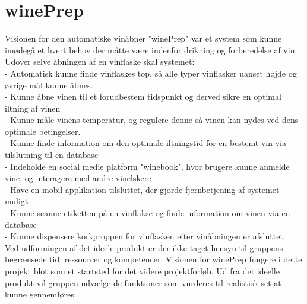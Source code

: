 \section{winePrep}
Visionen for den automatiske vinåbner "winePrep" var et system som kunne imødegå et hvert behov der måtte være indenfor drikning og forberedelse af vin. \\
Udover selve åbningen af en vinflaske skal systemet:\\
- Automatisk kunne finde vinflaskes top, så alle typer vinflasker uanset højde og øvrige mål kunne åbnes.\\ 
- Kunne åbne vinen til et forudbestem tidspunkt og derved sikre en optimal iltning af vinen\\
- Kunne måle vinens temperatur, og regulere denne så vinen kan nydes ved dens optimale betingelser.\\
- Kunne finde information om den optimale iltningstid for en bestemt vin via tilslutning til en database\\
- Indeholde en social medie platform "winebook", hvor brugere kunne anmelde vine, og interagere med andre vinelskere\\
- Have en mobil applikation tilsluttet, der gjorde fjernbetjening af systemet muligt\\
- Kunne scanne etiketten på en vinflakse og finde information om vinen via en database\\
- Kunne dispensere korkproppen for vinflasken efter vinåbningen er afsluttet.\\

Ved udformingen af det ideele produkt er der ikke taget hensyn til gruppens begrænsede tid, ressourcer og kompetencer. Visionen for winePrep fungere
i dette projekt blot som et startsted for det videre projektforløb. Ud fra det ideelle produkt vil gruppen udvælge de funktioner som vurderes til realistisk
set at kunne gennemføres. 

